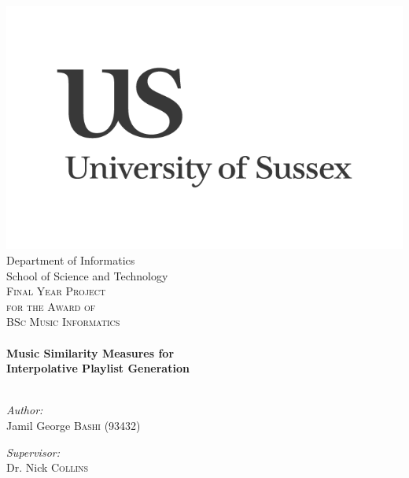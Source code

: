 \begin{titlepage}
\begin{center}
\texttt{}\\
\includegraphics[width=0.5\linewidth]{front/images/us-logo}\\
\small Department of Informatics\\
School of Science and Technology\\[2cm]

\textsc{\Large Final Year Project\\[0.1cm]
\small for the Award of\\[0.2cm]
\Large BSc Music Informatics}\\[1cm]

\hrulefill \\[0.8cm]
{ \huge \bfseries Music Similarity Measures for\\
Interpolative Playlist Generation}\\[0.8cm]

\hrulefill \\[2.5cm]
\begin{minipage}{0.45\textwidth}
\begin{flushleft} \large
\emph{Author:}\\
Jamil George \textsc{Bashi} (93432)
\end{flushleft}
\end{minipage}
\begin{minipage}{0.45\textwidth}
\begin{flushright} \large
\emph{Supervisor:} \\
Dr. Nick \textsc{Collins}
\end{flushright}
\end{minipage}
\vspace{25cm}

\end{center}
\end{titlepage}
